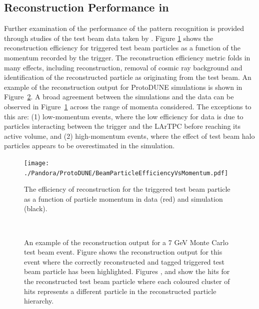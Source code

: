 \subsection{Reconstruction Performance in }
\label{sec:Pandora:ProtoDUNE}

Further examination of the performance of the  pattern recognition is provided through studies of the test beam data taken by .  Figure \ref{pandora_protodune_tbrecoeff} shows the reconstruction efficiency for triggered test beam particles as a function of the momentum recorded by the trigger.  The reconstruction efficiency metric folds in many effects, including reconstruction, removal of cosmic ray background and identification of the reconstructed particle as originating from the test beam.  An example of the  reconstruction output for ProtoDUNE  simulations is shown in Figure~\ref{pandora_protodune_reco}.  A broad agreement between the  simulations and the data can be observed in Figure~\ref{pandora_protodune_tbrecoeff} across the range of momenta considered.  The exceptions to this are: (1) low-momentum events, where the low efficiency for data is due to particles interacting between the trigger and the LArTPC before reaching its active volume, and (2) high-momentum events, where the effect of test beam halo particles appears to be overestimated in the simulation.

\begin{figure}[!ht]
\centering
\texttt{[image: ./Pandora/ProtoDUNE/BeamParticleEfficiencyVsMomentum.pdf]}
\caption[Reconstruction efficiency for the triggered test beam particle as a function of particle momentum in data and simulation.]{The efficiency of reconstruction for the triggered test beam particle as a function of particle momentum in data (red) and simulation (black).}
\label{pandora_protodune_tbrecoeff}
\end{figure}

\begin{figure}[!ht]
\centering
{} \\ 
\caption[Pandora reconstruction output for \SI{7}{GeV}  test beam event]{An example of the  reconstruction output for a 7 GeV Monte Carlo test beam event.  Figure \protect{} shows the \threed reconstruction output for this event where the correctly reconstructed and tagged triggered test beam particle has been highlighted.  Figures \protect{}, \protect{} and \protect{} show the \twod hits for the reconstructed test beam particle where each coloured cluster of hits represents a different particle in the reconstructed particle hierarchy.}
\label{pandora_protodune_reco}
\end{figure}

